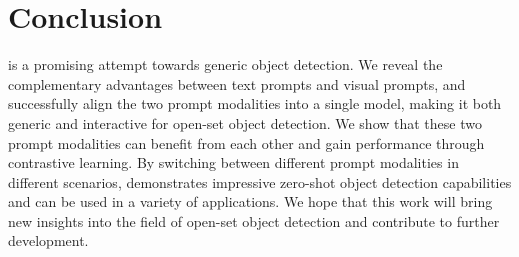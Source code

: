 \begin{table}[]
\centering
{}
\caption{Zero-shot object detection results on mixed prompt mode.}
\label{tab:joint_inference}
\end{table}



\section{Conclusion}
\ourmodel{} is a promising attempt towards generic object detection. We reveal the complementary advantages between text prompts and visual prompts, and successfully align the two prompt modalities into a single model, making it both generic and interactive for open-set object detection. We show that these two prompt modalities can benefit from each other and gain performance through contrastive learning. By switching between different prompt modalities in different scenarios, \ourmodel{} demonstrates impressive zero-shot object detection capabilities and can be used in a variety of applications. We hope that this work will bring new insights into the field of open-set object detection and contribute to further development.

